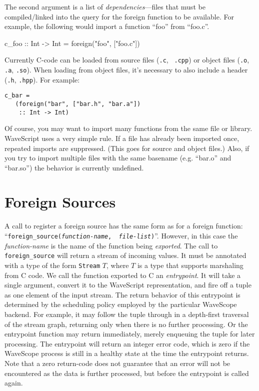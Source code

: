 The second argument is a list of {\em dependencies}---files that must
be compiled/linked into the query for the foreign function to be
available.
%
For example, the following would import a function ``foo'' from ``foo.c''.

\begin{wscode}
c\_foo :: Int -> Int = foreign("foo", ["foo.c"])
\end{wscode}


Currently C-code can be loaded from source files ({\tt .c}, {\tt
  .cpp}) or object files ({\tt .o}, {\tt .a}, {\tt .so}).  When
  loading from object files, it's necessary to also include a header
  ({\tt .h}, {\tt .hpp}).  For example:

\begin{verbatim}
c_bar = 
   (foreign("bar", ["bar.h", "bar.a"]) 
    :: Int -> Int)
\end{verbatim}

Of course, you may want to import many functions from the same file or
library.  WaveScript uses a very simple rule.  If a file has already
been imported once, repeated imports are suppressed.  (This goes for
source and object files.)  Also, if you try to import multiple files with
the same basename (e.g. ``bar.o'' and ``bar.so'') the behavior is
currently undefined.





\section{Foreign Sources}

A call to register a foreign source has the same form as for a foreign
function: ``{\tt foreign\_source({\em function-name}, {\em
file-list})}''.  However, in this case the {\em function-name} is the
name of the function being {\em exported}.  The call to {\tt
foreign\_source} will return a stream of incoming values.  It must be
annotated with a type of the form {\tt Stream} $T$, where $T$ is a
type that supports marshaling from C code.
%
We call the function exported to C an {\em entrypoint}.  It will take
a single argument, convert it to the WaveScript representation, and
fire off a tuple as one element of the input stream.  The return
behavior of this entrypoint is determined by the scheduling policy
employed by the particular WaveScope backend.  For example, it may
follow the tuple through in a depth-first traversal of the stream
graph, returning only when there is no further processing.  Or the
entrypoint function may return immediately, merely enqueuing the tuple
for later processing.  The entrypoint will return an integer error
code, which is zero if the WaveScope process is still in a healthy
state at the time the entrypoint returns.  Note that a zero
return-code does not guarantee that an error will not be encountered
as the data is further processed, but before the entrypoint is called
again.

